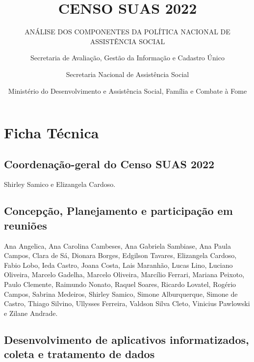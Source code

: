 \documentclass[
  letterpaper,
  DIV=11,
  numbers=noendperiod]{scrreprt}
\title{CENSO SUAS 2022}
\subtitle{ANÁLISE DOS COMPONENTES DA POLÍTICA NACIONAL DE ASSISTÊNCIA
SOCIAL}
\author{Secretaria de Avaliação, Gestão da Informação e Cadastro
Único \and Secretaria Nacional de Assistência Social \and Ministério do
Desenvolvimento e Assistência Social, Família e Combate à Fome}
\date{}
\renewcommand*\contentsname{Table of contents}
\newcommand\contentsname{Table of contents}
\begin{document}
\maketitle

\renewcommand*\contentsname{Sumário}
{
\hypersetup{linkcolor=}
\setcounter{tocdepth}{2}
\tableofcontents
}


\chapter*{Ficha Técnica}\label{ficha-tuxe9cnica}


\section*{Coordenação-geral do Censo SUAS
2022}\label{coordenauxe7uxe3o-geral-do-censo-suas-2022}


Shirley Samico e Elizangela Cardoso.

\section*{Concepção, Planejamento e participação em
reuniões}\label{concepuxe7uxe3o-planejamento-e-participauxe7uxe3o-em-reuniuxf5es}


Ana Angelica, Ana Carolina Cambeses, Ana Gabriela Sambiase, Ana Paula
Campos, Clara de Sá, Dionara Borges, Edgilson Tavares, Elizangela
Cardoso, Fabio Lobo, Ieda Castro, Joana Costa, Lais Maranhão, Lucas
Lino, Luciano Oliveira, Marcelo Gadelha, Marcelo Oliveira, Marcílio
Ferrari, Mariana Peixoto, Paulo Clemente, Raimundo Nonato, Raquel
Soares, Ricardo Lovatel, Rogério Campos, Sabrina Medeiros, Shirley
Samico, Simone Alburquerque, Simone de Castro, Thiago Silvino, Ullysses
Ferreira, Valdson Silva Cleto, Vinicius Pawlowski e Zilane Andrade.

\section*{Desenvolvimento de aplicativos informatizados, coleta e
tratamento de
dados}\label{desenvolvimento-de-aplicativos-informatizados-coleta-e-tratamento-de-dados}
\end{document}
